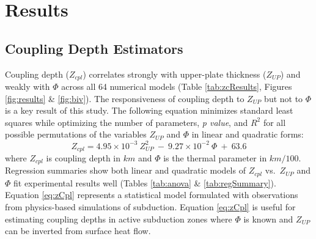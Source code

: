 \hypertarget{chpt2Results}{%
\section{Results}\label{chpt2Results}}

\hypertarget{cdEstimators}{%
\subsection{Coupling Depth Estimators}\label{cdEstimators}}

Coupling depth (\(Z_{cpl}\)) correlates strongly with upper-plate thickness (\(Z_{UP}\)) and weakly with \(\Phi\) across all 64 numerical models (Table \ref{tab:zcResults}, Figures \ref{fig:results} \& \ref{fig:biv}). The responsiveness of coupling depth to \(Z_{UP}\) but not to \(\Phi\) is a key result of this study. The following equation minimizes standard least squares while optimizing the number of parameters, \emph{p value}, and \(R^2\) for all possible permutations of the variables \(Z_{UP}\) and \(\Phi\) in linear and quadratic forms:
\begin{equation}
  Z_{cpl} = 4.95\times 10^{-3}\ Z_{UP}^{2}\ -\ 9.27\times 10^{-2}\ \Phi\ +\ 63.6
  \label{eq:zCpl}
\end{equation}
where \(Z_{cpl}\) is coupling depth in \(km\) and \(\Phi\) is the thermal parameter in \(km/100\). Regression summaries show both linear and quadratic models of \(Z_{cpl}\) vs.~\(Z_{UP}\) and \(\Phi\) fit experimental results well (Tables \ref{tab:anova} \& \ref{tab:regSummary}). Equation \eqref{eq:zCpl} represents a statistical model formulated with observations from physics-based simulations of subduction. Equation \eqref{eq:zCpl} is useful for estimating coupling depths in active subduction zones where \(\Phi\) is known and \(Z_{UP}\) can be inverted from surface heat flow.

